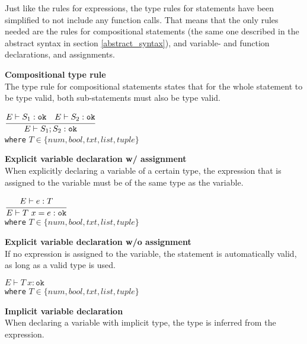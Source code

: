 Just like the rules for expressions, the type rules for statements have been simplified to not include any function calls.
That means that the only rules needed are the rules for compositional statements (the same one described in the abstract syntax in section \ref{abstract_syntax}), and variable- and function declarations, and assignments.

\textbf{Compositional type rule}\\
The type rule for compositional statements states that for the whole statement to be type valid, both sub-statements must also be type valid.

\begin{center}
	\begin{math}
	\cfrac
	{E \vdash S_1 : \texttt{ok}\quad E \vdash S_2 : \texttt{ok}}
	{E \vdash S_1;S_2 : \texttt{ok}}
	\end{math}
	\\[1\baselineskip]
	\texttt{where} $T \in \{num, bool, txt, list, tuple\}$
\end{center}


\textbf{Explicit variable declaration w/ assignment}\\
When explicitly declaring a variable of a certain type, the expression that is assigned to the variable must be of the same type as the variable.

\begin{center}
	\begin{math}
		\cfrac
		{E \vdash e : T}
		{E \vdash T\ x = e : \texttt{ok}}
	\end{math}
	\\[1\baselineskip]
	\texttt{where} $T \in \{num, bool, txt, list, tuple\}$
\end{center}

\textbf{Explicit variable declaration w/o assignment}\\
If no expression is assigned to the variable, the statement is automatically valid, as long as a valid type is used.

\begin{center}
	\begin{math}
		E \vdash T\ x : \texttt{ok}
	\end{math}
	\\[1\baselineskip]
	\texttt{where} $T \in \{num, bool, txt, list, tuple\}$
\end{center}

\textbf{Implicit variable declaration}\\
When declaring a variable with implicit type, the type is inferred from the expression.

